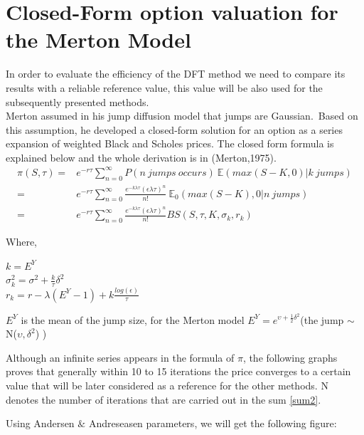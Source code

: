 \documentclass[12pt]{report}
\begin{document}
\section{Closed-Form option valuation for the Merton Model}
In order to evaluate the efficiency of the DFT method we need to  compare its results with a reliable reference value, this value will be also used for the subsequently presented methods.\\
Merton assumed in his jump diffusion model that jumps are Gaussian.~Based on this assumption, he developed a closed-form solution for an option as a series expansion of weighted Black and  Scholes prices. The closed form formula is explained below and the whole derivation is in (Merton,1975).
\begin{align}
\label{sum2}
\pi(S,\tau)=& e^{-r\tau} \sum \limits_{n=0}^{\infty} P(n~jumps~occurs)~\mathbb{E}(max(S-K,0)|k~jumps) \nonumber \\
=& e^{-r\tau} \sum \limits_{n=0}^{\infty} \frac{e^{-k \lambda \tau}(\epsilon \lambda \tau)^n}{n!} ~ \mathbb{E}_0(max(S-K),0|n~jumps)\nonumber \\
=& e^{-r\tau} \sum \limits_{n=0}^{\infty} \frac{e^{-k \lambda \tau}(\epsilon \lambda \tau)^n}{n!} BS(S,\tau,K,\sigma_k,r_k)
\end{align}

Where,
\begin{center}
$k=E^Y$\\
$\sigma_k^2=\sigma^2+\frac{k}{\tau} \delta^2$\\
$r_k=r-\lambda(E^Y-1)+k \frac{log(\epsilon)}{\tau}$\\
\end{center} 
$E^Y$ is the mean of the jump size, for the Merton model $E^Y = e^{\upsilon+\frac{1}{2}\delta^2}$(the jump $\sim$ N($\upsilon,\delta^2$) )

Although an infinite series appears in the formula of $\pi$, the following graphs proves that  generally within  10 to 15 iterations the price converges to a certain value that will be later considered  as a reference for the other methods. N denotes the number of iterations that are carried out in the sum \eqref{sum2}.



Using Andersen $\&$ Andreseasen parameters, we will get the following figure: 
\end{document}
